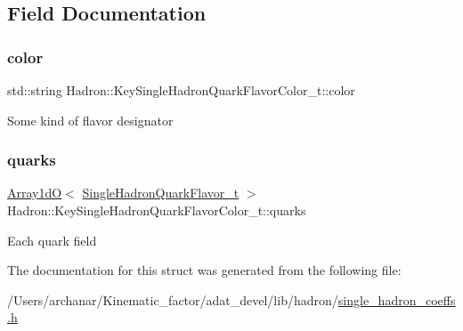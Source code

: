 \subsection{Field Documentation}
\mbox{\label{structHadron_1_1KeySingleHadronQuarkFlavorColor__t_aa5dc10dee689bef8e65d2b9230efdc85}} 
\subsubsection{\texorpdfstring{color}{color}}
{\footnotesize\ttfamily std\+::string Hadron\+::\+Key\+Single\+Hadron\+Quark\+Flavor\+Color\+\_\+t\+::color}

Some kind of flavor designator \mbox{\label{structHadron_1_1KeySingleHadronQuarkFlavorColor__t_ac52e7989b620c4733cc2e960394fd0fd}} 
\subsubsection{\texorpdfstring{quarks}{quarks}}
{\footnotesize\ttfamily \mbox{\hyperlink{classADAT_1_1Array1dO}{Array1dO}}$<$ \mbox{\hyperlink{structHadron_1_1SingleHadronQuarkFlavor__t}{Single\+Hadron\+Quark\+Flavor\+\_\+t}} $>$ Hadron\+::\+Key\+Single\+Hadron\+Quark\+Flavor\+Color\+\_\+t\+::quarks}

Each quark field 

The documentation for this struct was generated from the following file\+:\begin{DoxyCompactItemize}
\item 
/\+Users/archanar/\+Kinematic\+\_\+factor/adat\+\_\+devel/lib/hadron/\mbox{\hyperlink{lib_2hadron_2single__hadron__coeffs_8h}{single\+\_\+hadron\+\_\+coeffs.\+h}}\end{DoxyCompactItemize}
